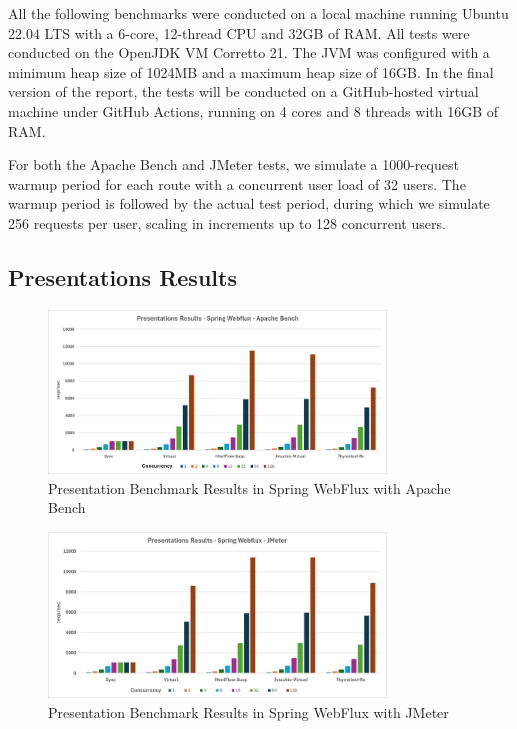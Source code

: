 \documentclass[../ppG48.tex]{subfiles}
\begin{document}
All the following benchmarks were conducted on a local machine running Ubuntu 22.04 LTS with a 6-core, 12-thread CPU and 32GB of RAM. All tests were conducted on the OpenJDK VM Corretto 21. The JVM was configured with a minimum heap size of 1024MB and a maximum heap size of 16GB.
In the final version of the report, the tests will be conducted on a GitHub-hosted virtual machine under GitHub Actions, running on 4 cores and 8 threads with 16GB of RAM.

For both the Apache Bench and JMeter tests, we simulate a 1000-request warmup period for each route with a concurrent user load of 32 users. The warmup period is followed by the actual test period, during which we simulate 256 requests per user, scaling in increments up to 128 concurrent users.
\subsection{Presentations Results}

\begin{figure}[h]
\centering \includegraphics[width=0.8\textwidth]{../Graphs/presentations-webflux-ab.png} \caption{Presentation Benchmark Results in Spring WebFlux with Apache Bench} \label{fig:presentations-webflux-ab} \end{figure}

\begin{figure}[h] \centering \includegraphics[width=0.8\textwidth]{../Graphs/presentations-webflux-jmeter.png} \caption{Presentation Benchmark Results in Spring WebFlux with JMeter} \label{fig:presentations-webflux-jmeter} \end{figure}
\end{document}
